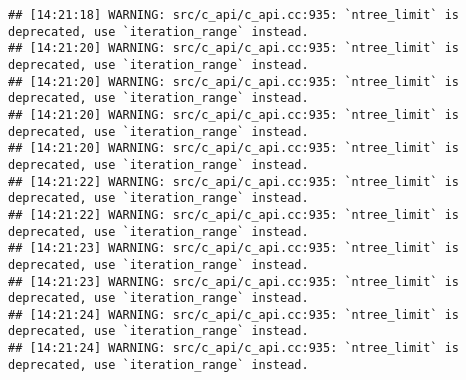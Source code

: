 \documentclass[
]{article}
\begin{document}
\begin{verbatim}
## [14:21:18] WARNING: src/c_api/c_api.cc:935: `ntree_limit` is deprecated, use `iteration_range` instead.
## [14:21:20] WARNING: src/c_api/c_api.cc:935: `ntree_limit` is deprecated, use `iteration_range` instead.
## [14:21:20] WARNING: src/c_api/c_api.cc:935: `ntree_limit` is deprecated, use `iteration_range` instead.
## [14:21:20] WARNING: src/c_api/c_api.cc:935: `ntree_limit` is deprecated, use `iteration_range` instead.
## [14:21:20] WARNING: src/c_api/c_api.cc:935: `ntree_limit` is deprecated, use `iteration_range` instead.
## [14:21:22] WARNING: src/c_api/c_api.cc:935: `ntree_limit` is deprecated, use `iteration_range` instead.
## [14:21:22] WARNING: src/c_api/c_api.cc:935: `ntree_limit` is deprecated, use `iteration_range` instead.
## [14:21:23] WARNING: src/c_api/c_api.cc:935: `ntree_limit` is deprecated, use `iteration_range` instead.
## [14:21:23] WARNING: src/c_api/c_api.cc:935: `ntree_limit` is deprecated, use `iteration_range` instead.
## [14:21:24] WARNING: src/c_api/c_api.cc:935: `ntree_limit` is deprecated, use `iteration_range` instead.
## [14:21:24] WARNING: src/c_api/c_api.cc:935: `ntree_limit` is deprecated, use `iteration_range` instead.
\end{verbatim}
\end{document}
